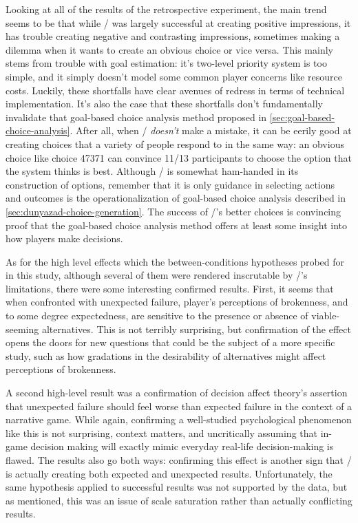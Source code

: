 Looking at all of the results of the retrospective experiment, the main trend seems to be that while \dunyazad/ was largely successful at creating positive impressions, it has trouble creating negative and contrasting impressions, sometimes making a dilemma when it wants to create an obvious choice or vice versa.
%
This mainly stems from trouble with goal estimation: it's two-level priority system is too simple, and it simply doesn't model some common player concerns like resource costs.
%
Luckily, these shortfalls have clear avenues of redress in terms of technical implementation.
%
It's also the case that these shortfalls don't fundamentally invalidate that goal-based choice analysis method proposed in \cref{sec:goal-based-choice-analysis}.
%
After all, when \dunyazad/ \emph{doesn't} make a mistake, it can be eerily good at creating choices that a variety of people respond to in the same way: an obvious choice like choice 47371 can convince 11/13 participants to choose the option that the system thinks is best.
%
Although \dunyazad/ is somewhat ham-handed in its construction of options, remember that it is only guidance in selecting actions and outcomes is the operationalization of goal-based choice analysis described in \cref{sec:dunyazad-choice-generation}.
%
The success of \dunyazad/'s better choices is convincing proof that the goal-based choice analysis method offers at least some insight into how players make decisions.


As for the high level effects which the between-conditions hypotheses probed for in this study, although several of them were rendered inscrutable by \dunyazad/'s limitations, there were some interesting confirmed results.
%
First, it seems that when confronted with unexpected failure, player's perceptions of brokenness, and to some degree expectedness, are sensitive to the presence or absence of viable-seeming alternatives.
%
This is not terribly surprising, but confirmation of the effect opens the doors for new questions that could be the subject of a more specific study, such as how gradations in the desirability of alternatives might affect perceptions of brokenness.


A second high-level result was a confirmation of decision affect theory's assertion that unexpected failure should feel worse than expected failure in the context of a narrative game.
%
While again, confirming a well-studied psychological phenomenon like this is not surprising, context matters, and uncritically assuming that in-game decision making will exactly mimic everyday real-life decision-making is flawed.
%
The results also go both ways: confirming this effect is another sign that \dunyazad/ is actually creating both expected and unexpected results.
%
Unfortunately, the same hypothesis applied to successful results was not supported by the data, but as mentioned, this was an issue of scale saturation rather than actually conflicting results.



